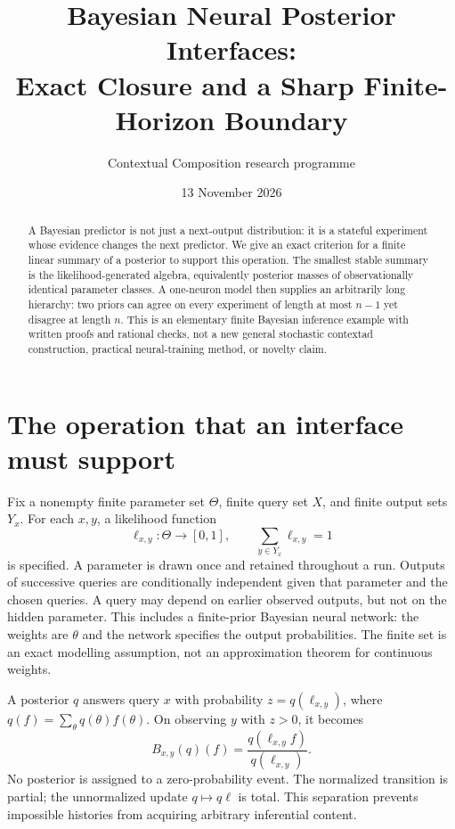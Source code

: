 \documentclass[11pt]{article}
\title{Bayesian Neural Posterior Interfaces:\\Exact Closure and a Sharp Finite-Horizon Boundary}
\author{Contextual Composition research programme}
\date{13 November 2026}
\begin{document}
\maketitle
\begin{abstract}
A Bayesian predictor is not just a next-output distribution: it is a stateful experiment whose evidence changes the next predictor. We give an exact criterion for a finite linear summary of a posterior to support this operation. The smallest stable summary is the likelihood-generated algebra, equivalently posterior masses of observationally identical parameter classes. A one-neuron model then supplies an arbitrarily long hierarchy: two priors can agree on every experiment of length at most $n-1$ yet disagree at length $n$. This is an elementary finite Bayesian inference example with written proofs and rational checks, not a new general stochastic contextad construction, practical neural-training method, or novelty claim.
\end{abstract}
\section{The operation that an interface must support}
Fix a nonempty finite parameter set $\Theta$, finite query set $X$, and finite output sets $Y_x$. For each $x,y$, a likelihood function
\[\ell_{x,y}:\Theta\longrightarrow[0,1],\qquad \sum_{y\in Y_x}\ell_{x,y}=1\]
is specified. A parameter is drawn once and retained throughout a run. Outputs of successive queries are conditionally independent given that parameter and the chosen queries. A query may depend on earlier observed outputs, but not on the hidden parameter. This includes a finite-prior Bayesian neural network: the weights are $\theta$ and the network specifies the output probabilities. The finite set is an exact modelling assumption, not an approximation theorem for continuous weights.

A posterior $q$ answers query $x$ with probability $z=q(\ell_{x,y})$, where $q(f)=\sum_\theta q(\theta)f(\theta)$. On observing $y$ with $z>0$, it becomes
\[ B_{x,y}(q)(f)=\frac{q(\ell_{x,y}f)}{q(\ell_{x,y})}. \tag{1}\]
No posterior is assigned to a zero-probability event. The normalized transition is partial; the unnormalized update $q\mapsto q\ell$ is total. This separation prevents impossible histories from acquiring arbitrary inferential content.
\end{document}

